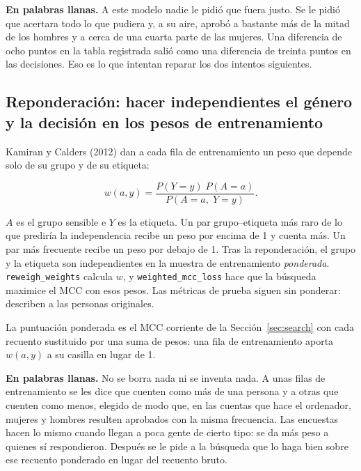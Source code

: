 \documentclass[11pt]{article}
\newcommand{\fn}[1]{\texttt{\small #1}}
\begin{document}
\begin{plainwords}
\textbf{En palabras llanas.} A este modelo nadie le pidió que fuera justo. Se le pidió que acertara todo lo que pudiera y, a su aire, aprobó a bastante más de la mitad de los hombres y a cerca de una cuarta parte de las mujeres. Una diferencia de ocho puntos en la tabla registrada salió como una diferencia de treinta puntos en las decisiones. Eso es lo que intentan reparar los dos intentos siguientes.
\end{plainwords}

\subsection{Reponderación: hacer independientes el género y la decisión en los pesos de entrenamiento}

Kamiran y Calders (2012) dan a cada fila de entrenamiento un peso que depende solo de su grupo y de su etiqueta:

\[
w(a, y)
=
\frac{P(Y = y)\; P(A = a)}{P(A = a,\; Y = y)}.
\]

\(A\) es el grupo sensible e \(Y\) es la etiqueta. Un par grupo--etiqueta más raro de lo que prediría la independencia recibe un peso por encima de 1 y cuenta más. Un par más frecuente recibe un peso por debajo de 1. Tras la reponderación, el grupo y la etiqueta son independientes en la muestra de entrenamiento \emph{ponderada}. \fn{reweigh\_weights} calcula \(w\), y \fn{weighted\_mcc\_loss} hace que la búsqueda maximice el MCC con esos pesos. Las métricas de prueba siguen sin ponderar: describen a las personas originales.

La puntuación ponderada es el MCC corriente de la Sección~\ref{sec:search} con cada recuento sustituido por una suma de pesos: una fila de entrenamiento aporta \(w(a, y)\) a su casilla en lugar de 1.

\begin{plainwords}
\textbf{En palabras llanas.} No se borra nada ni se inventa nada. A unas filas de entrenamiento se les dice que cuenten como más de una persona y a otras que cuenten como menos, elegido de modo que, en las cuentas que hace el ordenador, mujeres y hombres resulten aprobados con la misma frecuencia. Las encuestas hacen lo mismo cuando llegan a poca gente de cierto tipo: se da más peso a quienes sí respondieron. Después se le pide a la búsqueda que lo haga bien sobre ese recuento ponderado en lugar del recuento bruto.
\end{plainwords}
\end{document}
